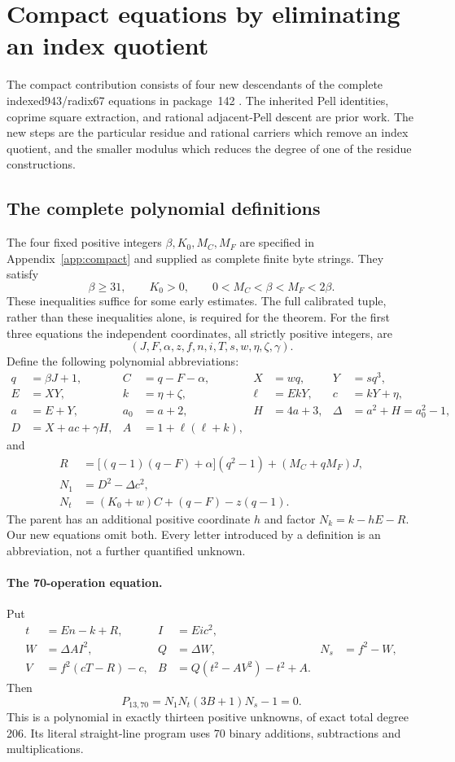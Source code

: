 \documentclass[11pt]{article}
\theoremstyle{remark}\newtheorem{remark}[theorem]{Remark}
\begin{document}
\section{Compact equations by eliminating an index quotient}\label{sec:quotient}
The compact contribution consists of four new descendants of the complete
indexed943/radix67 equations in package~142 \cite{coprime}. The inherited
Pell identities, coprime square extraction, and rational adjacent-Pell
descent are prior work. The new steps are the particular residue and
rational carriers which remove an index quotient, and the smaller modulus
which reduces the degree of one of the residue constructions.

\subsection{The complete polynomial definitions}

The four fixed positive integers $\beta,K_0,M_C,M_F$ are specified in
Appendix~\ref{app:compact} and supplied as complete finite byte strings.
They satisfy
\[
 \beta\ge31,\qquad K_0>0,\qquad 0<M_C<\beta<M_F<2\beta.
\]
These inequalities suffice for some early estimates. The full calibrated
tuple, rather than these inequalities alone, is required for the theorem.
For the first three equations the independent coordinates, all strictly
positive integers, are
\[
 (J,F,\alpha,z,f,n,i,T,s,w,\eta,\zeta,\gamma).
\]
Define the following polynomial abbreviations:
\begin{align*}
 q&=\beta J+1,& C&=q-F-\alpha,& X&=wq,&Y&=sq^3,\\
 E&=XY,&k&=\eta+\zeta,&\ell&=EkY,&c&=kY+\eta,\\
 a&=E+Y,&a_0&=a+2,&H&=4a+3,&\Delta&=a^2+H=a_0^2-1,\\
 D&=X+ac+\gamma H,&A&=1+\ell(\ell+k),
 \end{align*}
and
\begin{align*}
 R&=\bigl[(q-1)(q-F)+\alpha\bigr](q^2-1)+(M_C+qM_F)J,\\
 N_1&=D^2-\Delta c^2,\\
 N_t&=(K_0+w)C+(q-F)-z(q-1).
\end{align*}
The parent has an additional positive coordinate $h$ and factor
$N_k=k-hE-R$. Our new equations omit both. Every letter introduced by a
definition is an abbreviation, not a further quantified unknown.

\paragraph{The 70-operation equation.}
Put
\begin{align*}
 t&=En-k+R,& I&=Ei c^2,\\
 W&=\Delta A I^2,&Q&=\Delta W,&N_s&=f^2-W,\\
 V&=f^2(cT-R)-c,&B&=Q(t^2-AV^2)-t^2+A.
\end{align*}
Then
\begin{equation}\label{eq:p13raw}
 \boxed{P_{13,70}=N_1N_t(3B+1)N_s-1=0.}
\end{equation}
This is a polynomial in exactly thirteen positive unknowns, of exact
total degree 206. Its literal straight-line program uses 70 binary
additions, subtractions and multiplications.
\end{document}

